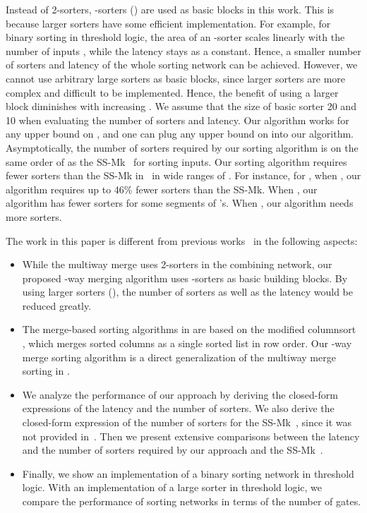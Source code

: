 \documentclass[10pt,journal,cspaper,compsoc]{IEEEtran}
\begin{document}
Instead of 2-sorters, -sorters () are used as basic blocks in this work. This is because larger sorters have some efficient implementation. For example, for binary sorting in threshold logic, the area of an -sorter scales linearly with the number of inputs , while the latency stays as a constant. Hence, a smaller number of sorters and latency of the whole sorting network can be achieved. However, we cannot use arbitrary large sorters as basic blocks, since larger sorters are more complex and difficult to be implemented. Hence, the benefit of using a larger block diminishes with increasing .
We assume that the size of basic sorter  20 and 10 when evaluating the number of sorters and latency. Our algorithm works for any upper bound on , and one can plug any upper bound on  into our algorithm. Asymptotically, the number of sorters required by our sorting algorithm is on the same order of  as the SS-Mk~\cite{gao1997sloping} for sorting  inputs. Our sorting algorithm requires fewer sorters than the SS-Mk in~\cite{gao1997sloping} in wide ranges of .
For instance, for , when , our algorithm requires up to 46\% fewer sorters than the SS-Mk. When , our algorithm has fewer sorters for some segments of 's. When , our algorithm needs more sorters.

The work in this paper is different from previous works~\cite{Lee95multiway,gao1997sloping,zhao1998efficient} in the following aspects:
\begin{itemize}
  \item While the multiway merge \cite{Lee95multiway} uses 2-sorters in the combining network, our proposed -way merging algorithm uses -sorters as basic building blocks. By using larger sorters (), the number of sorters as well as the latency would be reduced greatly.
  \item The merge-based sorting algorithms in \cite{gao1997sloping,zhao1998efficient} are based on the modified columnsort \cite{liszka1993generalized}, which merges sorted columns as a single sorted list in row order. Our -way merge sorting algorithm is a direct generalization of the multiway merge sorting in \cite{Lee95multiway}.
\item We analyze the performance of our approach by deriving the closed-form expressions of the latency and the number of sorters. We also derive the closed-form expression of the number of sorters for the SS-Mk~\cite{gao1997sloping}, since it was not provided in~\cite{gao1997sloping}. Then we present extensive comparisons between  the latency and the number of sorters required by our approach and the SS-Mk~\cite{gao1997sloping}.
  \item Finally, we show an implementation of a binary sorting network in threshold logic. With an implementation of a large sorter in threshold logic, we compare the performance of sorting networks in terms of the number of gates.
\end{itemize}
\end{document}
